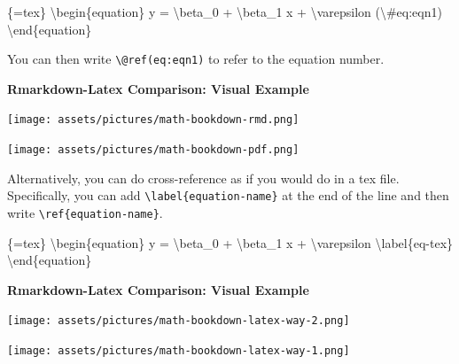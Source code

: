 \documentclass[
  letterpaper,
  DIV=11,
  numbers=noendperiod]{scrreprt}
\newenvironment{Shaded}{\begin{snugshade}}{\end{snugshade}}
\newcommand{\NormalTok}[1]{\textcolor[rgb]{0.00,0.23,0.31}{#1}}
\begin{document}
\begin{Shaded}
\begin{Highlighting}[]
\NormalTok{\textasciigrave{}\textasciigrave{}\textasciigrave{}\{=tex\}}
\NormalTok{\textbackslash{}begin\{equation\}}
\NormalTok{y = \textbackslash{}beta\_0 + \textbackslash{}beta\_1 x + \textbackslash{}varepsilon (\textbackslash{}\#eq:eqn1)}
\NormalTok{\textbackslash{}end\{equation\}}
\NormalTok{\textasciigrave{}\textasciigrave{}\textasciigrave{}}
\end{Highlighting}
\end{Shaded}

You can then write \texttt{\textbackslash{}@ref(eq:eqn1)} to refer to
the equation number.

\begin{tcolorbox}[enhanced jigsaw, colframe=quarto-callout-note-color-frame, breakable, left=2mm, toprule=.15mm, colback=white, arc=.35mm, rightrule=.15mm, bottomrule=.15mm, opacityback=0, leftrule=.75mm]

\textbf{Rmarkdown-Latex Comparison: Visual Example}\vspace{2mm}

\texttt{[image: assets/pictures/math-bookdown-rmd.png]}

\texttt{[image: assets/pictures/math-bookdown-pdf.png]}

\end{tcolorbox}

Alternatively, you can do cross-reference as if you would do in a tex
file. Specifically, you can add
\texttt{\textbackslash{}label\{equation-name\}} at the end of the line
and then write \texttt{\textbackslash{}ref\{equation-name\}}.

\begin{Shaded}
\begin{Highlighting}[]
\NormalTok{\textasciigrave{}\textasciigrave{}\textasciigrave{}\{=tex\}}
\NormalTok{\textbackslash{}begin\{equation\}}
\NormalTok{y = \textbackslash{}beta\_0 + \textbackslash{}beta\_1 x + \textbackslash{}varepsilon \textbackslash{}label\{eq{-}tex\}}
\NormalTok{\textbackslash{}end\{equation\}}
\NormalTok{\textasciigrave{}\textasciigrave{}\textasciigrave{}}
\end{Highlighting}
\end{Shaded}

\begin{tcolorbox}[enhanced jigsaw, colframe=quarto-callout-note-color-frame, breakable, left=2mm, toprule=.15mm, colback=white, arc=.35mm, rightrule=.15mm, bottomrule=.15mm, opacityback=0, leftrule=.75mm]

\textbf{Rmarkdown-Latex Comparison: Visual Example}\vspace{2mm}

\texttt{[image: assets/pictures/math-bookdown-latex-way-2.png]}

\texttt{[image: assets/pictures/math-bookdown-latex-way-1.png]}

\end{tcolorbox}
\end{document}
